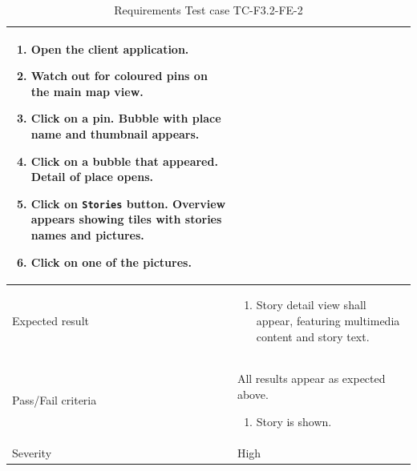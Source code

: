\documentclass[11pt]{book}
\begin{document}
\begin{table}
\begin{tabular}{| p{3cm} | p{9.5cm} |}
                            \begin{enumerate}
                              \item Open the client application.
                              \item Watch out for coloured pins on the main map view.
                              \item Click on a pin. Bubble with place name and thumbnail appears.
                              \item Click on a bubble that appeared. Detail of place opens.
                              \item Click on \texttt{Stories} button. Overview appears showing tiles with stories names and pictures.
                              \item Click on one of the pictures.
                            \end{enumerate} \\ \hline 
    Expected result       & \begin{enumerate}
                              \item Story detail view shall appear, featuring multimedia content and story text.
                            \end{enumerate} \\ \hline 
    Pass/Fail criteria    & All results appear as expected above.
                            \begin{enumerate}
                              \item Story is shown.
                            \end{enumerate} \\ \hline 
    Severity              & High \\ \hline 
  \end{tabular}
  \caption{Requirements Test case TC-F3.2-FE-2}
  \label{tab:TCF3.2FE2}
\end{table}
\end{document}
